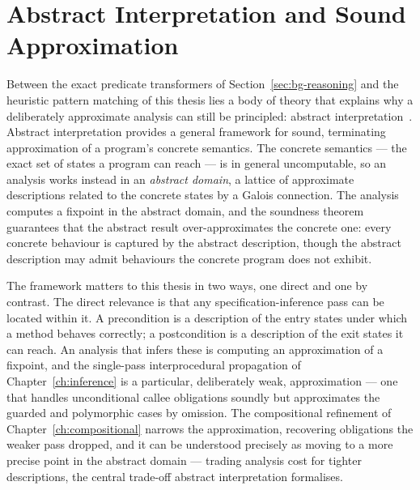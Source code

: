 \section{Abstract Interpretation and Sound Approximation}
\label{sec:bg-absint}

Between the exact predicate transformers of Section~\ref{sec:bg-reasoning} and
the heuristic pattern matching of this thesis lies a body of theory that
explains why a deliberately approximate analysis can still be principled:
abstract interpretation~\cite{cousot1977abstract}. Abstract interpretation
provides a general framework for sound, terminating approximation of a program's
concrete semantics. The concrete semantics --- the exact set of states a program
can reach --- is in general uncomputable, so an analysis works instead in an
\emph{abstract domain}, a lattice of approximate descriptions related to the
concrete states by a Galois connection. The analysis computes a fixpoint in the
abstract domain, and the soundness theorem guarantees that the abstract result
over-approximates the concrete one: every concrete behaviour is captured by the
abstract description, though the abstract description may admit behaviours the
concrete program does not exhibit.

The framework matters to this thesis in two ways, one direct and one by
contrast. The direct relevance is that any specification-inference pass can be
located within it. A precondition is a description of the entry states under
which a method behaves correctly; a postcondition is a description of the exit
states it can reach. An analysis that infers these is computing an approximation
of a fixpoint, and the single-pass interprocedural propagation of
Chapter~\ref{ch:inference} is a particular, deliberately weak, approximation ---
one that handles unconditional callee obligations soundly but approximates the
guarded and polymorphic cases by omission. The compositional refinement of
Chapter~\ref{ch:compositional} narrows the approximation, recovering obligations
the weaker pass dropped, and it can be understood precisely as moving to a more
precise point in the abstract domain --- trading analysis cost for tighter
descriptions, the central trade-off abstract interpretation formalises.

